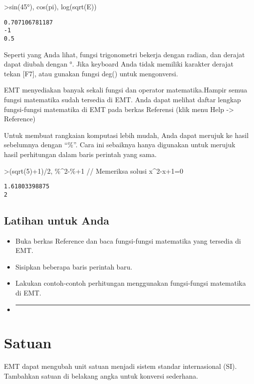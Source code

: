 \documentclass[
]{book}
\begin{document}
\textgreater sin(45°), cos(pi), log(sqrt(E))

\begin{verbatim}
0.707106781187
-1
0.5
\end{verbatim}

Seperti yang Anda lihat, fungsi trigonometri bekerja dengan radian, dan derajat dapat diubah dengan °. Jika keyboard Anda tidak memiliki karakter derajat tekan {[}F7{]}, atau gunakan fungsi deg() untuk mengonversi.

EMT menyediakan banyak sekali fungsi dan operator matematika.Hampir semua fungsi matematika sudah tersedia di EMT. Anda dapat melihat daftar lengkap fungsi-fungsi matematika di EMT pada berkas Referensi (klik menu Help -\textgreater{} Reference)

Untuk membuat rangkaian komputasi lebih mudah, Anda dapat merujuk ke hasil sebelumnya dengan ``\%''. Cara ini sebaiknya hanya digunakan untuk merujuk hasil perhitungan dalam baris perintah yang sama.

\textgreater(sqrt(5)+1)/2, \%\^{}2-\%+1 // Memeriksa solusi x\^{}2-x+1=0

\begin{verbatim}
1.61803398875
2
\end{verbatim}

\section{Latihan untuk Anda}\label{latihan-untuk-anda-1}

\begin{itemize}
\item
  Buka berkas Reference dan baca fungsi-fungsi matematika yang tersedia di EMT.
\item
  Sisipkan beberapa baris perintah baru.
\item
  Lakukan contoh-contoh perhitungan menggunakan fungsi-fungsi matematika di EMT.
\item
  \begin{center}\rule{0.5\linewidth}{0.5pt}\end{center}
\end{itemize}

\chapter{Satuan}\label{satuan}

EMT dapat mengubah unit satuan menjadi sistem standar internasional (SI). Tambahkan satuan di belakang angka untuk konversi sederhana.
\end{document}
